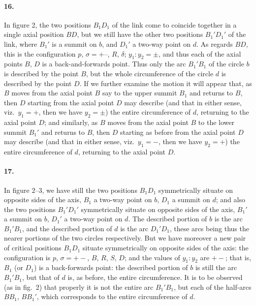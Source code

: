 \documentclass[11pt,a4paper]{article}
\theoremstyle{plain}
\begin{document}
\paragraph{16.} In figure 2, the two positions $B_1D_1$ of the link come to coincide together in a single axial position $BD$, but we still have the other two positions $B_1'D_1'$ of the link, where $B_1'$ is a summit on $b$, and $D_1'$ a two-way point on $d$. As regards $BD$, this is the configuration $p$, $\sigma = +\text{--}$, $R$, $\delta$; $y_1 : y_2 = \pm$, and thus each of the axial points $B$, $D$ is a back-and-forwards point. Thus only the arc $B_1'B_1$ of the circle $b$ is described by the point $B$, but the whole circumference of the circle $d$ is described by the point $D$. If we further examine the motion it will appear that, as $B$ moves from the axial point $B$ say to the upper summit $B_1$ and returns to $B$, then $D$ starting from the axial point $D$ may describe (and that in either sense, viz.~$y_1 = +$, then we have $y_2 = \pm$) the entire circumference of $d$, returning to the axial point $D$; and similarly, as $B$ moves from the axial point $B$ to the lower summit $B_1'$ and returns to $B$, then $D$ starting as before from the axial point $D$ may describe (and that in either sense, viz.~$y_1 = -$, then we have $y_2 = +$) the entire circumference of $d$, returning to the axial point $D$.

\newpage

\paragraph{17.} In figure $2\text{--}3$, we have still the two positions $B_1D_1$ symmetrically situate on opposite sides of the axis, $B_1$ a two-way point on $b$, $D_1$ a summit on $d$; and also the two positions $B_1'D_1'$ symmetrically situate on opposite sides of the axis, $B_1'$ a summit on $b$, $D_1'$ a two-way point on $d$. The described portion of $b$ is the arc $B_1'B_1$, and the described portion of $d$ is the arc $D_1'D_1$, these arcs being thus the nearer portions of the two circles respectively. But we have moreover a new pair of critical positions $B_1D_1$ situate symmetrically on opposite sides of the axis: the configuration is $p$, $\sigma = +-$, $B$, $R$, $S$, $D$; and the values of $y_1 : y_2$ are $+-$; that is, $B_1$ (or $D_1$) is a back-forwards point: the described portion of $b$ is still the arc $B_1'B_1$, but that of $d$ is, as before, the entire circumference. It is to be observed (as in fig.~2) that properly it is not the entire arc $B_1'B_1$, but each of the half-arcs $BB_1$, $BB_1'$, which corresponds to the entire circumference of $d$.
\end{document}
